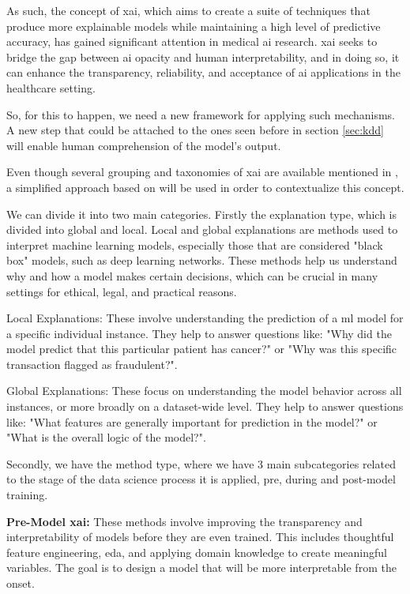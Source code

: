 As such, the concept of \ac{xai}, which aims to create a suite of techniques that produce more explainable models while maintaining a high level of predictive accuracy, has gained significant attention in medical \ac{ai} research. \ac{xai} seeks to bridge the gap between \ac{ai} opacity and human interpretability, and in doing so, it can enhance the transparency, reliability, and acceptance of \ac{ai} applications in the healthcare setting.

So, for this to happen, we need a new framework for applying such mechanisms. A new step that could be attached to the ones seen before in section \ref{sec:kdd} will enable human comprehension of the model's output.

Even though several grouping and taxonomies of \ac{xai} are available mentioned in \cite{adadiPeekingBlackBoxSurvey2018,linardatosExplainableAIReview2020,barredoarrietaExplainableArtificialIntelligence2020,linardatosExplainableAIReview2020,kamath2021explainable}, a simplified approach based on \cite{kamath2021explainable} will be used in order to contextualize this concept.

We can divide it into two main categories. Firstly the explanation type, which is divided into global and local. Local and global explanations are methods used to interpret machine learning models, especially those that are considered "black box" models, such as deep learning networks. These methods help us understand why and how a model makes certain decisions, which can be crucial in many settings for ethical, legal, and practical reasons.

Local Explanations: These involve understanding the prediction of a \ac{ml} model for a specific individual instance. They help to answer questions like: "Why did the model predict that this particular patient has cancer?" or "Why was this specific transaction flagged as fraudulent?". 

Global Explanations: These focus on understanding the model behavior across all instances, or more broadly on a dataset-wide level. They help to answer questions like: "What features are generally important for prediction in the model?" or "What is the overall logic of the model?". 

Secondly, we have the method type, where we have 3 main subcategories related to the stage of the data science process it is applied, pre, during and post-model training.

\textbf{Pre-Model \ac{xai}:} These methods involve improving the transparency and interpretability of models before they are even trained. This includes thoughtful feature engineering, \ac{eda}, and applying domain knowledge to create meaningful variables. The goal is to design a model that will be more interpretable from the onset.

